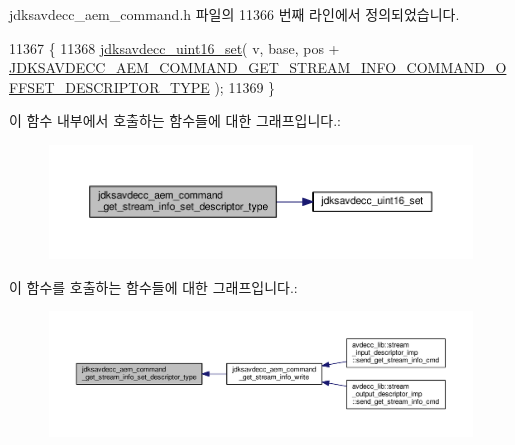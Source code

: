 jdksavdecc\+\_\+aem\+\_\+command.\+h 파일의 11366 번째 라인에서 정의되었습니다.


\begin{DoxyCode}
11367 \{
11368     \hyperlink{group__endian_ga14b9eeadc05f94334096c127c955a60b}{jdksavdecc\_uint16\_set}( v, base, pos + 
      \hyperlink{group__command__get__stream__info_ga1bdfb005dd86aa625755510019b76a90}{JDKSAVDECC\_AEM\_COMMAND\_GET\_STREAM\_INFO\_COMMAND\_OFFSET\_DESCRIPTOR\_TYPE}
       );
11369 \}
\end{DoxyCode}


이 함수 내부에서 호출하는 함수들에 대한 그래프입니다.\+:
\nopagebreak
\begin{figure}[H]
\begin{center}
\leavevmode
\includegraphics[width=350pt]{group__command__get__stream__info_ga30b7a8bb43631792757b2107fd6b353f_cgraph}
\end{center}
\end{figure}




이 함수를 호출하는 함수들에 대한 그래프입니다.\+:
\nopagebreak
\begin{figure}[H]
\begin{center}
\leavevmode
\includegraphics[width=350pt]{group__command__get__stream__info_ga30b7a8bb43631792757b2107fd6b353f_icgraph}
\end{center}
\end{figure}


